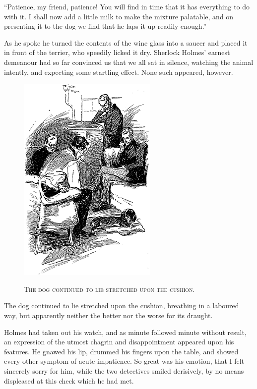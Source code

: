 \documentclass[12pt,english,oneside]{book}
\newcommand{\noun}[1]{\textsc{#1}}
\begin{document}
{}``Patience, my friend, patience! You will find in time that it
has everything to do with it. I shall now add a little milk to make
the mixture palatable, and on presenting it to the dog we find that
he laps it up readily enough.''

As he spoke he turned the contents of the wine glass into a saucer
and placed it in front of the terrier, who speedily licked it dry.
Sherlock Holmes' earnest demeanour had so far convinced us that we
all sat in silence, watching the animal intently, and expecting some
startling effect. None such appeared, however. %
\begin{figure}[htbp]
\noindent \begin{center}\includegraphics{images/study10-stud-12.png}\end{center}

\noindent \begin{center}\noun{The dog continued to lie stretched
upon the cushion.}\end{center}
\end{figure}
The dog continued to lie stretched upon the cushion, breathing in
a laboured way, but apparently neither the better nor the worse for
its draught.

Holmes had taken out his watch, and as minute followed minute without
result, an expression of the utmost chagrin and disappointment appeared
upon his features. He gnawed his lip, drummed his fingers upon the
table, and showed every other symptom of acute impatience. So great
was his emotion, that I felt sincerely sorry for him, while the two
detectives smiled derisively, by no means displeased at this check
which he had met.
\end{document}
